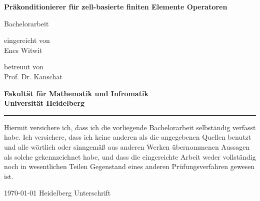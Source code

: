 \documentclass[12pt,a4paper]{scrartcl}
\numberwithin{equation}{section}
\begin{document}
\pagestyle{empty}




\begin{titlepage}

\vspace*{1cm} 
\begin{center} 


\textbf{\Huge Präkonditionierer für zell-basierte finiten Elemente Operatoren} 
\vspace*{2cm}

{\Large Bachelorarbeit}
\vspace*{1cm}


eingereicht von \\[0.5cm]

{\Large Enes Witwit}
\vspace*{1cm}

betreuut von  \\[0.5cm]
{\Large Prof. Dr. Kanschat}
\vspace*{3cm}

\textbf{
Fakultät für Mathematik und Infromatik\\[1cm]
Universität Heidelberg}
\end{center}
\end{titlepage}



\newpage
\thispagestyle{empty}
\vspace*{14cm}

\noindent\rule{16cm}{0.4pt}

Hiermit versichere ich, dass ich die vorliegende Bachelorarbeit selbständig
verfasst habe.
Ich versichere, dass ich keine anderen als die angegebenen Quellen benutzt und
alle wörtlich oder sinngemäß aus anderen Werken übernommenen Aussagen als
solche gekennzeichnet habe, und dass die eingereichte Arbeit weder vollständig
noch in wesentlichen Teilen Gegenstand eines anderen Prüfungsverfahren
gewesen ist. \\[2ex] 

\noindent

\today \hspace*{1cm}  Heidelberg \hspace*{5cm} Unterschrift\\[5ex]

\end{document}

